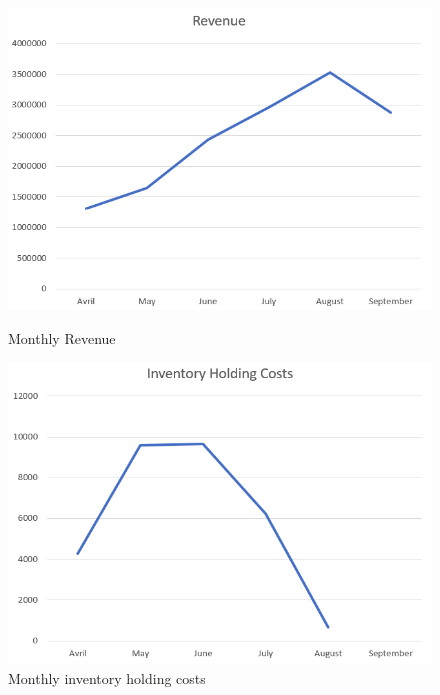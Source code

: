 \documentclass [a4paper,12pt,titlepage]{article}
\begin{document}
\begin{figure}[H]
    \begin{minipage}[b]{0.5\linewidth}
        \centering \includegraphics[scale=0.3]{graph3.png}
        \caption{Monthly Revenue}
    \end{minipage}\hfill
    \begin{minipage}[b]{0.5\linewidth}
        \centering \includegraphics[scale=0.3]{graph4.png}
        \caption{Monthly inventory holding costs}
    \end{minipage}
\end{figure}
\end{document}
